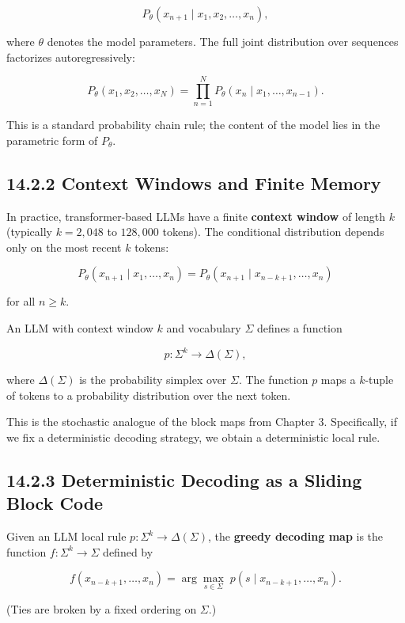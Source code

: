 \[P_\theta(x_{n+1} \mid x_1, x_2, \ldots, x_n),\]

where $\theta$ denotes the model parameters. The full joint distribution over sequences factorizes autoregressively:

\[P_\theta(x_1, x_2, \ldots, x_N) = \prod_{n=1}^{N} P_\theta(x_n \mid x_1, \ldots, x_{n-1}).\]

This is a standard probability chain rule; the content of the model lies in the parametric form of $P_\theta$.

\subsection{14.2.2 Context Windows and Finite Memory}

In practice, transformer-based LLMs have a finite \textbf{context window} of length $k$ (typically $k = 2{,}048$ to $128{,}000$ tokens). The conditional distribution depends only on the most recent $k$ tokens:

\[P_\theta(x_{n+1} \mid x_1, \ldots, x_n) = P_\theta(x_{n+1} \mid x_{n-k+1}, \ldots, x_n)\]

for all $n \geq k$.

\begin{definition}
An LLM with context window $k$ and vocabulary $\Sigma$ defines a function

\[p: \Sigma^k \to \Delta(\Sigma),\]

where $\Delta(\Sigma)$ is the probability simplex over $\Sigma$. The function $p$ maps a $k$-tuple of tokens to a probability distribution over the next token.

This is the stochastic analogue of the block maps from Chapter 3. Specifically, if we fix a deterministic decoding strategy, we obtain a deterministic local rule.
\end{definition}

\subsection{14.2.3 Deterministic Decoding as a Sliding Block Code}

\begin{definition}
Given an LLM local rule $p: \Sigma^k \to \Delta(\Sigma)$, the \textbf{greedy decoding map} is the function $f: \Sigma^k \to \Sigma$ defined by

\[f(x_{n-k+1}, \ldots, x_n) = \arg\max_{s \in \Sigma} \; p(s \mid x_{n-k+1}, \ldots, x_n).\]

(Ties are broken by a fixed ordering on $\Sigma$.)
\end{definition}

